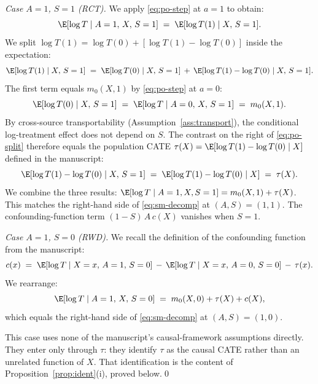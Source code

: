 \emph{Case $A = 1$, $S = 1$ (RCT).}
We apply \eqref{eq:po-step} at $a = 1$ to obtain:
\begin{equation}
\E[\log T \mid A = 1,\, X,\, S = 1] \;=\; \E[\log T(1) \mid X,\, S = 1].
\end{equation}
We split $\log T(1) = \log T(0) + [\log T(1) - \log T(0)]$ inside the expectation:
\begin{equation}
\E[\log T(1) \mid X,\, S = 1] \;=\; \E[\log T(0) \mid X,\, S = 1] \,+\, \E[\log T(1) - \log T(0) \mid X,\, S = 1].
\label{eq:po-split}
\end{equation}
The first term equals $m_0(X, 1)$ by \eqref{eq:po-step} at $a = 0$:
\begin{equation}
\E[\log T(0) \mid X,\, S = 1] \;=\; \E[\log T \mid A = 0,\, X,\, S = 1] \;=\; m_0(X, 1).
\end{equation}
By cross-source transportability (Assumption~\ref{ass:transport}), the conditional log-treatment effect does not depend on $S$.
The contrast on the right of \eqref{eq:po-split} therefore equals the population CATE $\tau(X) = \E[\log T(1) - \log T(0) \mid X]$ defined in the manuscript:
\begin{equation}
\E[\log T(1) - \log T(0) \mid X,\, S = 1] \;=\; \E[\log T(1) - \log T(0) \mid X] \;=\; \tau(X).
\end{equation}
We combine the three results: $\E[\log T \mid A = 1, X, S = 1] = m_0(X, 1) + \tau(X)$.
This matches the right-hand side of \eqref{eq:sm-decomp} at $(A, S) = (1, 1)$.
The confounding-function term $(1 - S)\,A\,c(X)$ vanishes when $S = 1$.

\emph{Case $A = 1$, $S = 0$ (RWD).}
We recall the definition of the confounding function from the manuscript:
\begin{equation}
c(x) \;=\; \E[\log T \mid X = x,\, A = 1,\, S = 0] \,-\, \E[\log T \mid X = x,\, A = 0,\, S = 0] \,-\, \tau(x).
\label{eq:sm-cf}
\end{equation}
We rearrange:
\begin{equation}
\E[\log T \mid A = 1,\, X,\, S = 0] \;=\; m_0(X, 0) + \tau(X) + c(X),
\end{equation}
which equals the right-hand side of \eqref{eq:sm-decomp} at $(A, S) = (1, 0)$.

This case uses none of the manuscript's causal-framework assumptions directly.
They enter only through $\tau$: they identify $\tau$ as the causal CATE rather than an unrelated function of $X$.
That identification is the content of Proposition~\ref{prop:ident}(i), proved below.\qed

